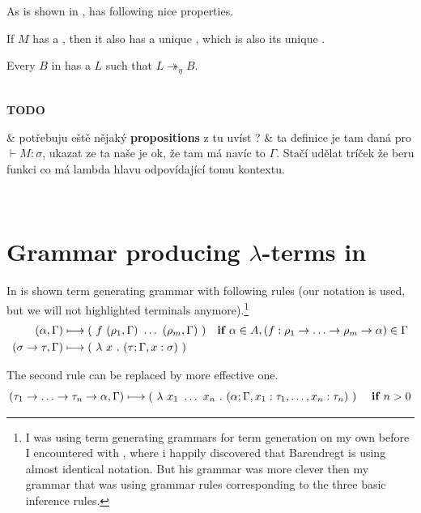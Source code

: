 \documentclass[12pt,a4paper]{report}
\newcommand{\lterms}{$\lambda$-terms\xspace}
\newcommand{\tur}[3]{#1\vdash{}#2:#3}
\newenvironment{todo}
{ ~\\[0.5em]
  {\color{red}\textbf{TODO}}
  \begin{easylist}[itemize]}
{ \end{easylist}
  ~}
\begin{document}
As is shown in \cite{barendregt10}, \lnf has following nice properties.

\begin{proposition}
If $M$ has a \bnf, 
then it also has a unique \lnf, 
which is also its unique \beenf.
\end{proposition}

\begin{proposition}
Every $B$ in \bnf has a \lnf 
$L$ such that $L \twoheadrightarrow_{\eta} B$.
\end{proposition}


\begin{todo}
 & potřebuju eště nějaký \textbf{propositions} z \cite{barendregt10} tu uvíst ?
 & ta definice je tam daná pro $\tur{}{M}{\sigma}$,
   ukazat ze ta naše je ok, že tam má navíc to $\Gamma$.
   Stačí udělat tríček že beru funkci co má lambda hlavu odpovídající 
   tomu kontextu.
\end{todo}






\section{Grammar producing \lterms in \lnf}
\label{barlike}

In \cite{barendregt10} is shown term generating grammar with 
following rules (our notation is used, but we will not 
highlighted terminals anymore).\footnote{
I was using term generating grammars for term generation
on my own before I encountered with \cite{barendregt10},
where i happily discovered that Barendregt is using
almost identical notation. 
But his \lnf grammar was more clever then my grammar
that was using grammar rules corresponding to the three basic
inference rules. 
}
\begin{align*}
( \alpha , \Gamma )  
&\gar
(~f~( \rho_1 , \Gamma )~\dots~( \rho_m , \Gamma )~)
& \textbf{if } \alpha \in A,
(f : \rho_1 \ar \dots \ar \rho_m \ar \alpha) \in \Gamma
\\ 
( \sigma \rightarrow \tau , \Gamma )  
&\gar
(~\lambda~x~.~( \tau ; \Gamma,x:\sigma )~)
&   
\end{align*}

The second rule can be replaced by more effective one.
\[ 
( \tau_1 \ar \dots \ar \tau_n \ar \alpha , \Gamma )  
\gar
(~\lambda~x_1~\dots~x_n~.~
( \alpha ; \Gamma , x_1:\tau_1 , \dots , x_n:\tau_n  )~)
~~~~ \textbf{if } n > 0
\] 
\end{document}
